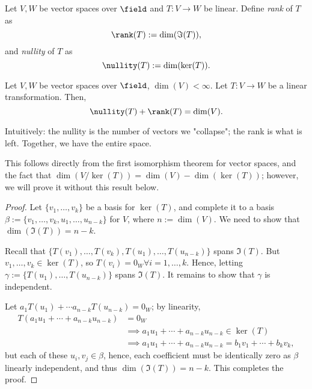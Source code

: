 \begin{definition}
    Let $V, W$ be vector spaces over $\field$ and $T: V \to W$ be linear. Define \emph{rank} of $T$ as \[
    \rank(T) := \dim (\Im(T)),
    \]
    and \emph{nullity} of $T$ as \[
    \nullity(T) := \dim(\ker(T)).    
    \]
\end{definition}

\begin{theorem}
    Let $V, W$ be vector spaces over $\field$, $\dim (V) < \infty$. Let $T: V \to W$ be a linear transformation. Then, \[
        \nullity(T) + \rank(T) = \dim(V).    
    \]
\end{theorem}

\begin{remark}
    Intuitively: the nullity is the number of vectors we "collapse"; the rank is what is left. Together, we have the entire space.
\end{remark}

\begin{remark}
    This follows directly from the first isomorphism theorem for vector spaces, and the fact that $\dim(V / \ker (T)) = \dim (V) - \dim (\ker (T))$; however, we will prove it without this result below.
\end{remark}

\begin{proof}
        Let $\{v_1, \dots, v_k\}$ be a basis for $\ker (T)$, and complete it to a basis $\beta := \{v_1, \dots, v_k, u_1, \dots, u_{n-k}\}$ for $V$,  where $n := \dim (V)$. We need to show that $\dim(\Im(T)) = n-k$.

        Recall that $\{T(v_1), \dots, T(v_k), T(u_1), \dots, T(u_{n-k})\}$ spans $\Im(T)$. But $v_1, \dots, v_k \in \ker (T)$, so $T(v_i) = 0_W \forall i = 1, \dots, k$. Hence, letting $\gamma := \{T(u_1), \dots, T(u_{n-k})\}$ spans $\Im(T)$. It remains to show that $\gamma$ is independent.

        Let $a_1 T(u_1) + \cdots a_{n-k} T(u_{n-k}) = 0_W$; by linearity, \begin{align*}
            T(a_1 u_1 + \cdots+ a_{n-k} u_{n-k}) &= 0_W\\
            &\implies a_1 u_1 +\cdots  + a_{n-k} u_{n-k} \in \ker (T)\\
            &\implies a_1 u_1 + \cdots + a_{n-k}u_{n-k} = b_1 v_1 + \cdots + b_k v_k,
        \end{align*}
        but each of these $u_i, v_j \in \beta$, hence, each coefficient must be identically zero as $\beta$ linearly independent, and thus $\dim (\Im(T)) = n -k$. This completes the proof.
\end{proof}

